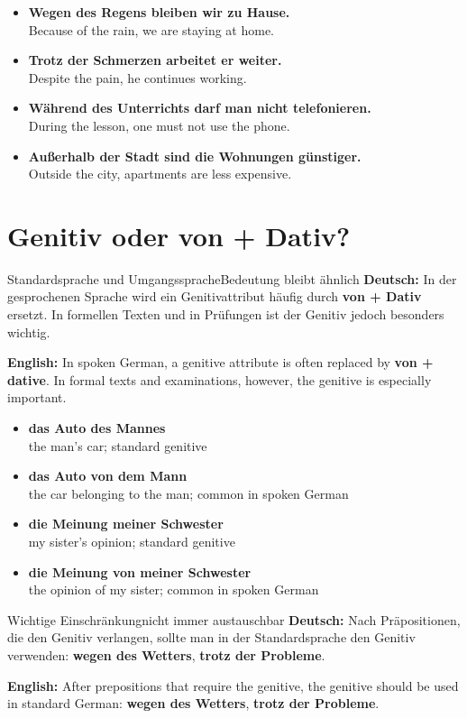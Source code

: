 \documentclass[a4paper,11pt]{article}
\newcommand{\GermanText}[1]{\textbf{Deutsch: }#1\par}
\newcommand{\EnglishText}[1]{{\small\color{SoftGray}\textbf{English: }#1\par}}
\newcommand{\ExampleItem}[2]{\item \textbf{#1}\\{\small\color{SoftGray}#2}}
\begin{document}
        \begin{exbox}
            \begin{itemize}
                \ExampleItem{Wegen des Regens bleiben wir zu Hause.}{Because of the rain, we are staying at home.}
                \ExampleItem{Trotz der Schmerzen arbeitet er weiter.}{Despite the pain, he continues working.}
                \ExampleItem{Während des Unterrichts darf man nicht telefonieren.}{During the lesson, one must not use the phone.}
                \ExampleItem{Außerhalb der Stadt sind die Wohnungen günstiger.}{Outside the city, apartments are less expensive.}
            \end{itemize}
        \end{exbox}

    \section{Genitiv oder von + Dativ?}

        \begin{grammarentry}{Standardsprache und Umgangssprache}{Bedeutung bleibt ähnlich}
            \GermanText{In der gesprochenen Sprache wird ein Genitivattribut häufig durch \textbf{von + Dativ} ersetzt. In formellen Texten und in Prüfungen ist der Genitiv jedoch besonders wichtig.}
            \EnglishText{In spoken German, a genitive attribute is often replaced by \textbf{von + dative}. In formal texts and examinations, however, the genitive is especially important.}
        \end{grammarentry}

        \begin{exbox}
            \begin{itemize}
                \ExampleItem{das Auto des Mannes}{the man's car; standard genitive}
                \ExampleItem{das Auto von dem Mann}{the car belonging to the man; common in spoken German}
                \ExampleItem{die Meinung meiner Schwester}{my sister's opinion; standard genitive}
                \ExampleItem{die Meinung von meiner Schwester}{the opinion of my sister; common in spoken German}
            \end{itemize}
        \end{exbox}

        \begin{grammarentry}{Wichtige Einschränkung}{nicht immer austauschbar}
            \GermanText{Nach Präpositionen, die den Genitiv verlangen, sollte man in der Standardsprache den Genitiv verwenden: \textbf{wegen des Wetters}, \textbf{trotz der Probleme}.}
            \EnglishText{After prepositions that require the genitive, the genitive should be used in standard German: \textbf{wegen des Wetters}, \textbf{trotz der Probleme}.}
        \end{grammarentry}
\end{document}
